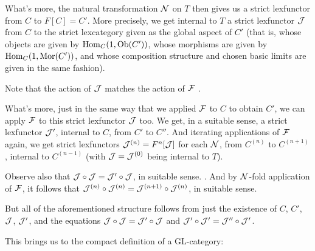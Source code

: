 What's more, the natural transformation $\mathcal{N}$ on $T$ then gives us a strict lexfunctor from $C$ to $F[C] = C'$. More precisely, we get internal to $T$ a strict lexfunctor $\mathcal{J}$ from $C$ to the strict lexcategory given as the global aspect of $C'$ (that is, whose objects are given by $\operatorname{Hom}_C(1, \operatorname{Ob}(C'))$, whose morphisms are given by $\operatorname{Hom}_C(1, \operatorname{Mor}(C'))$, and whose composition structure and chosen basic limits are given in the same fashion).

Note that the action of $\mathcal{J}$ matches the action of $\mathcal{F}$ \TODO.

What's more, just in the same way that we applied $\mathcal{F}$ to $C$ to obtain $C'$, we can apply $\mathcal{F}$ to this strict lexfunctor $\mathcal{J}$ too. We get, in a suitable sense, a strict lexfunctor $\mathcal{J}'$, internal to $C$, from $C'$ to $C''$. And iterating applications of $\mathcal{F}$ again, we get strict lexfunctors $\mathcal{J}^{(n)} = F^n[\mathcal{J}]$ for each $\mathcal{N}$, from $C^{(n)}$ to $C^{(n + 1)}$, internal to $C^{(n - 1)}$ (with $\mathcal{J} = \mathcal{J}^{(0)}$ being internal to $T$). \TODO

Observe also that $\mathcal{J} \circ \mathcal{J} = \mathcal{J}' \circ \mathcal{J}$, in suitable sense. \TODO. And by $\mathcal{N}$-fold application of $\mathcal{F}$, it follows that $\mathcal{J}^{(n)} \circ \mathcal{J}^{(n)} = \mathcal{J}^{(n + 1)} \circ \mathcal{J}^{(n)}$, in suitable sense.

But all of the aforementioned structure follows from just the existence of $C$, $C'$, $\mathcal{J}$, $\mathcal{J}'$, and the equations $\mathcal{J} \circ \mathcal{J} = \mathcal{J}' \circ \mathcal{J}$ and $\mathcal{J}' \circ \mathcal{J}' = \mathcal{J}'' \circ \mathcal{J}'$. 

This brings us to the compact definition of a GL-category:

